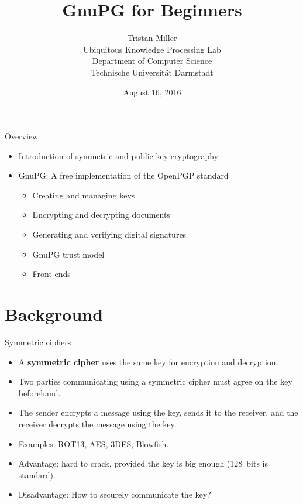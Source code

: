 \documentclass[%
mode=present,%
paper=smartboard,
size=20pt,
]{powerdot}
\title{GnuPG for Beginners}
\author{%
  Tristan Miller\\
  Ubiquitous Knowledge Processing Lab\\
  Department of Computer Science\\
  Technische Universit\"at Darmstadt
}
\date{August 16, 2016}
\begin{document}
\maketitle

\begin{slide}[toc=]{Overview}
  \begin{itemize}
  \item Introduction of symmetric and public-key cryptography
  \item GnuPG: A free implementation of the OpenPGP standard
    \begin{itemize}
    \item Creating and managing keys
    \item Encrypting and decrypting documents
    \item Generating and verifying digital signatures
    \item GnuPG trust model
    \item Front ends
    \end{itemize}
  \end{itemize}
\end{slide}

\section{Background}
\begin{slide}{Symmetric ciphers}
  \begin{itemize}
  \item A \textbf{symmetric cipher} uses the same key for encryption
    and decryption.
  \item Two parties communicating using a symmetric cipher must agree
    on the key beforehand.
  \item The sender encrypts a message using the key,
    sends it to the receiver, and the receiver decrypts the message
    using the key.
  \item Examples: ROT13, AES, 3DES, Blowfish.
  \item Advantage: hard to crack, provided the key is big enough
    (128~bits is standard).
  \item Disadvantage: How to securely communicate the key?
  \end{itemize}
\end{slide}
\end{document}
